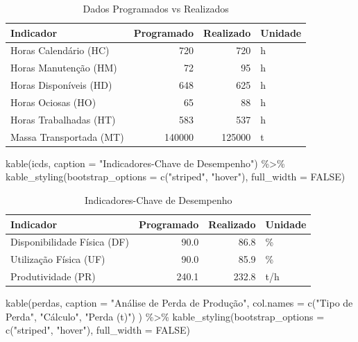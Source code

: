 \documentclass[
  letterpaper,
]{book}
\newenvironment{Shaded}{\begin{snugshade}}{\end{snugshade}}
\newcommand{\AttributeTok}[1]{\textcolor[rgb]{0.40,0.45,0.13}{#1}}
\newcommand{\ConstantTok}[1]{\textcolor[rgb]{0.56,0.35,0.01}{#1}}
\newcommand{\FunctionTok}[1]{\textcolor[rgb]{0.28,0.35,0.67}{#1}}
\newcommand{\NormalTok}[1]{\textcolor[rgb]{0.00,0.23,0.31}{#1}}
\newcommand{\SpecialCharTok}[1]{\textcolor[rgb]{0.37,0.37,0.37}{#1}}
\newcommand{\StringTok}[1]{\textcolor[rgb]{0.13,0.47,0.30}{#1}}
\begin{document}
\begin{longtable}[t]{lrrl}
\caption{Dados Programados vs Realizados}\\
\toprule
Indicador & Programado & Realizado & Unidade\\
\midrule
Horas Calendário (HC) & 720 & 720 & h\\
Horas Manutenção (HM) & 72 & 95 & h\\
Horas Disponíveis (HD) & 648 & 625 & h\\
Horas Ociosas (HO) & 65 & 88 & h\\
Horas Trabalhadas (HT) & 583 & 537 & h\\
\addlinespace
Massa Transportada (MT) & 140000 & 125000 & t\\
\bottomrule
\end{longtable}

\begin{Shaded}
\begin{Highlighting}[]
\FunctionTok{kable}\NormalTok{(icds, }\AttributeTok{caption =} \StringTok{"Indicadores{-}Chave de Desempenho"}\NormalTok{) }\SpecialCharTok{\%\textgreater{}\%}
    \FunctionTok{kable\_styling}\NormalTok{(}\AttributeTok{bootstrap\_options =} \FunctionTok{c}\NormalTok{(}\StringTok{"striped"}\NormalTok{, }\StringTok{"hover"}\NormalTok{), }\AttributeTok{full\_width =} \ConstantTok{FALSE}\NormalTok{)}
\end{Highlighting}
\end{Shaded}

\begin{longtable}[t]{lrrl}
\caption{Indicadores-Chave de Desempenho}\\
\toprule
Indicador & Programado & Realizado & Unidade\\
\midrule
Disponibilidade Física (DF) & 90.0 & 86.8 & \%\\
Utilização Física (UF) & 90.0 & 85.9 & \%\\
Produtividade (PR) & 240.1 & 232.8 & t/h\\
\bottomrule
\end{longtable}

\begin{Shaded}
\begin{Highlighting}[]
\FunctionTok{kable}\NormalTok{(perdas,}
    \AttributeTok{caption =} \StringTok{"Análise de Perda de Produção"}\NormalTok{,}
    \AttributeTok{col.names =} \FunctionTok{c}\NormalTok{(}\StringTok{"Tipo de Perda"}\NormalTok{, }\StringTok{"Cálculo"}\NormalTok{, }\StringTok{"Perda (t)"}\NormalTok{)}
\NormalTok{) }\SpecialCharTok{\%\textgreater{}\%}
    \FunctionTok{kable\_styling}\NormalTok{(}\AttributeTok{bootstrap\_options =} \FunctionTok{c}\NormalTok{(}\StringTok{"striped"}\NormalTok{, }\StringTok{"hover"}\NormalTok{), }\AttributeTok{full\_width =} \ConstantTok{FALSE}\NormalTok{)}
\end{Highlighting}
\end{Shaded}
\end{document}
